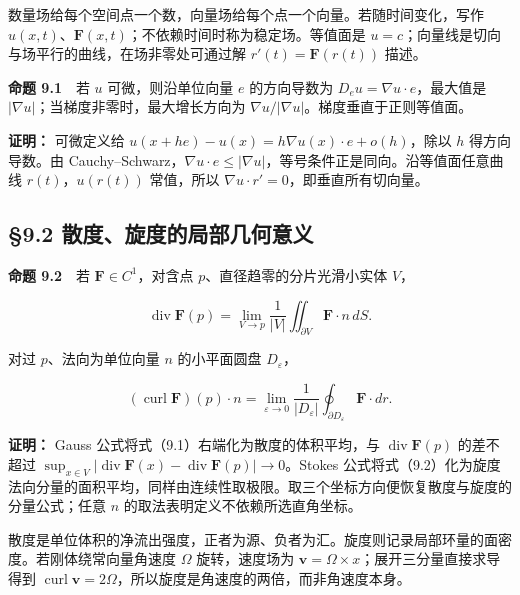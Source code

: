 \documentclass[11pt,a4paper]{article}
\begin{document}
数量场给每个空间点一个数，向量场给每个点一个向量。若随时间变化，写作
\(u(x,t)\)、\(\mathbf F(x,t)\)；不依赖时间时称为稳定场。等值面是
\(u=c\)；向量线是切向与场平行的曲线，在场非零处可通过解
\(r'(t)=\mathbf F(r(t))\) 描述。

\textbf{命题 9.1}　若 \(u\) 可微，则沿单位向量 \(e\) 的方向导数为
\(D_eu=\nabla u\cdot e\)，最大值是
\(|\nabla u|\)；当梯度非零时，最大增长方向为
\(\nabla u/|\nabla u|\)。梯度垂直于正则等值面。

\textbf{证明：} 可微定义给
\(u(x+he)-u(x)=h\nabla u(x)\cdot e+o(h)\)，除以 \(h\) 得方向导数。由
Cauchy--Schwarz，\(\nabla u\cdot e\le|\nabla u|\)，等号条件正是同向。沿等值面任意曲线
\(r(t)\)，\(u(r(t))\) 常值，所以
\(\nabla u\cdot r'=0\)，即垂直所有切向量。

\subsection{§9.2
散度、旋度的局部几何意义}\label{ux6563ux5ea6ux65cbux5ea6ux7684ux5c40ux90e8ux51e0ux4f55ux610fux4e49}

\textbf{命题 9.2}　若 \(\mathbf F\in C^1\)，对含点
\(p\)、直径趋零的分片光滑小实体 \(V\)，

\begin{equation*}
 \operatorname{div}\mathbf F(p)
 =\lim_{V\to p}\frac1{|V|}\iint_{\partial V}\mathbf F\cdot n\,dS.\tag{9.1}
\end{equation*}

对过 \(p\)、法向为单位向量 \(n\) 的小平面圆盘 \(D_\varepsilon\)，

\begin{equation*}
 (\operatorname{curl}\mathbf F)(p)\cdot n
 =\lim_{\varepsilon\to0}\frac1{|D_\varepsilon|}
       \oint_{\partial D_\varepsilon}\mathbf F\cdot dr.\tag{9.2}
\end{equation*}

\textbf{证明：} Gauss 公式将式（9.1）右端化为散度的体积平均，与
\(\operatorname{div}\mathbf F(p)\) 的差不超过
\(\sup_{x\in V}|\operatorname{div}\mathbf F(x)-\operatorname{div}\mathbf F(p)|\to0\)。Stokes
公式将式（9.2）化为旋度法向分量的面积平均，同样由连续性取极限。取三个坐标方向便恢复散度与旋度的分量公式；任意
\(n\) 的取法表明定义不依赖所选直角坐标。

散度是单位体积的净流出强度，正者为源、负者为汇。旋度则记录局部环量的面密度。若刚体绕常向量角速度
\(\Omega\) 旋转，速度场为
\(\mathbf v=\Omega\times x\)；展开三分量直接求导得到
\(\operatorname{curl}\mathbf v=2\Omega\)，所以旋度是角速度的两倍，而非角速度本身。
\end{document}
